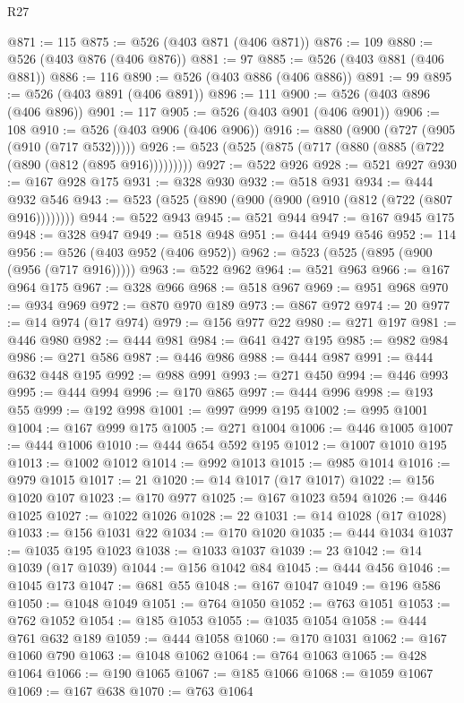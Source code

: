 \begin{lexlean}{R27}
\begin{coremodule}
@871 := 115
@875 := @526 (@403 @871 (@406 @871))
@876 := 109
@880 := @526 (@403 @876 (@406 @876))
@881 := 97
@885 := @526 (@403 @881 (@406 @881))
@886 := 116
@890 := @526 (@403 @886 (@406 @886))
@891 := 99
@895 := @526 (@403 @891 (@406 @891))
@896 := 111
@900 := @526 (@403 @896 (@406 @896))
@901 := 117
@905 := @526 (@403 @901 (@406 @901))
@906 := 108
@910 := @526 (@403 @906 (@406 @906))
@916 := @880 (@900 (@727 (@905 (@910 (@717 @532)))))
@926 := @523 (@525 (@875 (@717 (@880 (@885 (@722 (@890 (@812 (@895 @916)))))))))
@927 := @522 @926
@928 := @521 @927
@930 := @167 @928 @175
@931 := @328 @930
@932 := @518 @931
@934 := @444 @932 @546
@943 := @523 (@525 (@890 (@900 (@900 (@910 (@812 (@722 (@807 @916))))))))
@944 := @522 @943
@945 := @521 @944
@947 := @167 @945 @175
@948 := @328 @947
@949 := @518 @948
@951 := @444 @949 @546
@952 := 114
@956 := @526 (@403 @952 (@406 @952))
@962 := @523 (@525 (@895 (@900 (@956 (@717 @916)))))
@963 := @522 @962
@964 := @521 @963
@966 := @167 @964 @175
@967 := @328 @966
@968 := @518 @967
@969 := @951 @968
@970 := @934 @969
@972 := @870 @970 @189
@973 := @867 @972
@974 := 20
@977 := @14 @974 (@17 @974)
@979 := @156 @977 @22
@980 := @271 @197
@981 := @446 @980
@982 := @444 @981
@984 := @641 @427 @195
@985 := @982 @984
@986 := @271 @586
@987 := @446 @986
@988 := @444 @987
@991 := @444 @632 @448 @195
@992 := @988 @991
@993 := @271 @450
@994 := @446 @993
@995 := @444 @994
@996 := @170 @865
@997 := @444 @996
@998 := @193 @55
@999 := @192 @998
@1001 := @997 @999 @195
@1002 := @995 @1001
@1004 := @167 @999 @175
@1005 := @271 @1004
@1006 := @446 @1005
@1007 := @444 @1006
@1010 := @444 @654 @592 @195
@1012 := @1007 @1010 @195
@1013 := @1002 @1012
@1014 := @992 @1013
@1015 := @985 @1014
@1016 := @979 @1015
@1017 := 21
@1020 := @14 @1017 (@17 @1017)
@1022 := @156 @1020 @107
@1023 := @170 @977
@1025 := @167 @1023 @594
@1026 := @446 @1025
@1027 := @1022 @1026
@1028 := 22
@1031 := @14 @1028 (@17 @1028)
@1033 := @156 @1031 @22
@1034 := @170 @1020
@1035 := @444 @1034
@1037 := @1035 @195 @1023
@1038 := @1033 @1037
@1039 := 23
@1042 := @14 @1039 (@17 @1039)
@1044 := @156 @1042 @84
@1045 := @444 @456
@1046 := @1045 @173
@1047 := @681 @55
@1048 := @167 @1047
@1049 := @196 @586
@1050 := @1048 @1049
@1051 := @764 @1050
@1052 := @763 @1051
@1053 := @762 @1052
@1054 := @185 @1053
@1055 := @1035 @1054
@1058 := @444 @761 @632 @189
@1059 := @444 @1058
@1060 := @170 @1031
@1062 := @167 @1060 @790
@1063 := @1048 @1062
@1064 := @764 @1063
@1065 := @428 @1064
@1066 := @190 @1065
@1067 := @185 @1066
@1068 := @1059 @1067
@1069 := @167 @638
@1070 := @763 @1064

\end{coremodule}
\end{lexlean}

